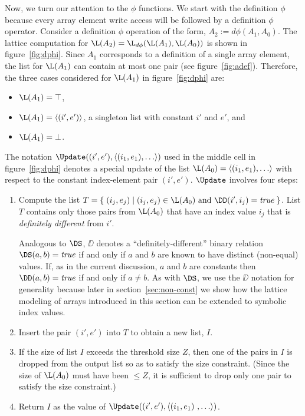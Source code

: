 Now, we turn our attention to the $\phi$ functions.  We start with the
definition $\phi$ because every array element write access will be followed by a definition $\phi$ operator.
Consider a
definition $\phi$ operation
of the form, $A_2 := d\phi(A_1, A_0)$.  
The lattice computation for $\L(A_2) = \L_{d\phi}(\L(A_1), \L(A_0))$
is shown in figure~\ref{fig:dphi}.  Since $A_1$ corresponds to a definition
of a single array element, the list for $\L(A_1)$ can contain
at most one pair (see figure~\ref{fig:adef}).
Therefore, the three cases considered for $\L(A_1)$ in figure~\ref{fig:dphi}
are:
\begin{itemize}
\item  $\L(A_1) = \top$, 

\item $\L(A_1) = \langle(i',e')\rangle$, a singleton list with
constant $i'$ and $e'$, and

\item $\L(A_1) = \bot$.

\end{itemize}

The notation 
$\Update((i',e'),\langle (i_1,e_1), \ldots \rangle)$
used in the middle cell in 
figure~\ref{fig:dphi} denotes a special update of 
the list $\L(A_0) = \langle (i_1,e_1), \ldots \rangle$
with respect to the constant
index-element pair $(i',e')$. $\Update$ involves four steps\label{def:update}:
\begin{enumerate}
\item Compute the list $T = \{\;(i_j,e_j)\;|\;(i_j,e_j)\in\L(A_0)
\mbox{~and~}\DD(i',i_j)=\mbox{\it true}\;\}$.  List $T$
contains only those pairs from $\L(A_0)$ that have an index
value $i_j$ that is {\it definitely different} from $i'$.

Analogous to $\DS$, $\DD$ denotes a ``definitely-different'' binary
relation \ie $\DS(a,b) = \mbox{\it true}$ if and only if $a$ and
$b$ are known to have distinct (non-equal) values.  If, as in the current
discussion, $a$ and $b$ are constants then $\DD(a,b) = \mbox{\it
true}$ if and only if $a\not=b$.
As with $\DS$, we use the $\DD$ notation for generality because later in
section~\ref{sec:non-const} we show how the lattice modeling of arrays
introduced in this section can be extended to symbolic index values.

\item Insert the pair $(i',e')$ into $T$ to obtain a new list, $I$.
\item If the 
size of list
$I$ exceeds the threshold size $Z$, then one of the pairs in $I$ is
dropped from the output list so as to satisfy the size constraint.  
(Since the size of $\L(A_0)$ must have been $\leq Z$, it is sufficient
to drop only one pair to satisfy the size constraint.)
\item Return $I$ as the value of 
$\Update((i',e'),\langle (i_1,e_1)\
, \ldots \rangle)$.
\end{enumerate}

